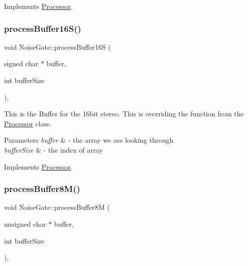 Implements \hyperlink{classProcessor_ae6494e06d5dfa0e000a809981078b41c}{Processor}.

\mbox{\label{classNoiseGate_ad4da7fd52a07d637e24e69475d1ed89f}} 
\subsubsection{\texorpdfstring{process\+Buffer16\+S()}{processBuffer16S()}}
{\footnotesize\ttfamily void Noise\+Gate\+::process\+Buffer16S (\begin{DoxyParamCaption}\item[{signed char $\ast$}]{buffer,  }\item[{int}]{buffer\+Size }\end{DoxyParamCaption})\hspace{0.3cm}{\ttfamily [override]}, {\ttfamily [virtual]}}

This is the Buffer for the 16bit stereo. This is overriding the function from the \hyperlink{classProcessor}{Processor} class. 
\begin{DoxyParams}{Parameters}
{\em buffer} & -\/ the array we are looking through \\
\hline
{\em buffer\+Size} & -\/ the index of array \\
\hline
\end{DoxyParams}


Implements \hyperlink{classProcessor_a8e00c52bcb0f38c3707f55fe69351e12}{Processor}.

\mbox{\label{classNoiseGate_a01d2a4ba032b2b853f19d5f02c998c53}} 
\subsubsection{\texorpdfstring{process\+Buffer8\+M()}{processBuffer8M()}}
{\footnotesize\ttfamily void Noise\+Gate\+::process\+Buffer8M (\begin{DoxyParamCaption}\item[{unsigned char $\ast$}]{buffer,  }\item[{int}]{buffer\+Size }\end{DoxyParamCaption})\hspace{0.3cm}{\ttfamily [override]}, {\ttfamily [virtual]}}

